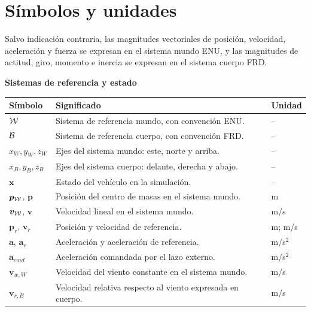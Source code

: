 \clearpage
\begingroup
\pagestyle{empty}
\thispagestyle{empty}
\section*{Símbolos y unidades}

\hypersetup{allcolors=black}
\setlength{\parindent}{0cm}
\renewcommand{\arraystretch}{1.06}\begin{singlespace}
Salvo indicación contraria, las magnitudes vectoriales de posición,
velocidad, aceleración y fuerza se expresan en el sistema mundo ENU, y las
magnitudes de actitud, giro, momento e inercia se expresan en el sistema
cuerpo FRD.

\newcommand{\simbolosbloque}[1]{%
  \vspace{0.7em}\noindent\textbf{#1}\par\vspace{0.2em}%
}
\newcommand{\cabeceratablasimbolos}{%
  \toprule
  \textbf{Símbolo} & \textbf{Significado} & \textbf{Unidad} \\
  \midrule
}

\simbolosbloque{Sistemas de referencia y estado}
\footnotesize
\begin{tabularx}{\textwidth}{@{}>{\raggedright\arraybackslash}p{}>{\raggedright\arraybackslash}X>{\raggedright\arraybackslash}p{}@{}}
\cabeceratablasimbolos
$\mathcal{W}$ & Sistema de referencia mundo, con convención ENU. & -- \\
$\mathcal{B}$ & Sistema de referencia cuerpo, con convención FRD. & -- \\
$x_W,y_W,z_W$ & Ejes del sistema mundo: este, norte y arriba. & -- \\
$x_B,y_B,z_B$ & Ejes del sistema cuerpo: delante, derecha y abajo. & -- \\
$\bm{x}$ & Estado del vehículo en la simulación. & -- \\
$\bm{p}_{\mathcal{W}}$, $\bm{p}$ & Posición del centro de masas en el sistema mundo. & m \\
$\bm{v}_{\mathcal{W}}$, $\bm{v}$ & Velocidad lineal en el sistema mundo. & m/s \\
$\bm{p}_r$, $\bm{v}_r$ & Posición y velocidad de referencia. & m; m/s \\
$\bm{a}$, $\bm{a}_r$ & Aceleración y aceleración de referencia. & m/s$^2$ \\
$\bm{a}_{cmd}$ & Aceleración comandada por el lazo externo. & m/s$^2$ \\
$\bm{v}_{w,W}$ & Velocidad del viento constante en el sistema mundo. & m/s \\
$\bm{v}_{r,B}$ & Velocidad relativa respecto al viento expresada en cuerpo. & m/s \\
\bottomrule
\end{tabularx}
\normalsize


\end{singlespace}
